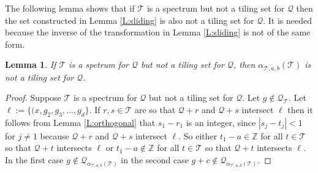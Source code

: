 \documentclass[12pt]{amsart}
\theoremstyle{plain}
\newtheorem{lemma}[theorem]{Lemma}
\numberwithin{equation}{section}
\newcommand{\Q}{\ensuremath{\mathcal{Q}}\xspace}
\newcommand{\T}{\ensuremath{\mathcal{T}}\xspace}
\newcommand{\Z}{\ensuremath{\mathbb{Z}}\xspace}
\begin{document}
The following lemma shows that if \T is a spectrum but not a tiling
set for \Q then the set constructed in Lemma \ref{L:sliding} is also
not a tiling set for \Q. It is needed because the inverse of the
transformation in Lemma \ref{L:sliding} is not of the same form.

\begin{lemma}\label{L:contradiction}
    If \T is a spetrum for \Q but not a tiling set for \Q, then
       $\alpha_{\T,a,b}(\T)$ is not a tiling set for \Q.
\end{lemma}
\begin{proof}
 Suppose \T is a spectrum
   for \Q but not a tiling set for \Q. Let $g\notin\Q_{\T}$. Let
   $\ell:=\{(x,g_2,g_3,\ldots,g_d\}$. If $r,s\in\T$ are so that
   $\Q+r$ and $\Q+s$ intersect $\ell$ then it follows from Lemma
   \ref{L:orthogonal} that $s_1-r_1$ is an integer, since
   $|s_{j}-t_{j}|<1$ for $j\neq 1$ because $\Q+r$ and $\Q+s$
   intersect $\ell$. So either
   $t_1-a\in\Z$ for all $t\in\T$ so that $\Q+t$ intersects $\ell$ or
   $t_1-a\notin\Z$ for all $t\in\T$ so that $\Q+t$ intersects $\ell$.
   In the first case $g\notin\Q_{\alpha_{\T,a,b}(\T)}$ in the second
   case $g+c\notin\Q_{\alpha_{\T,a,b}(\T)}$.
\end{proof}
\end{document}
